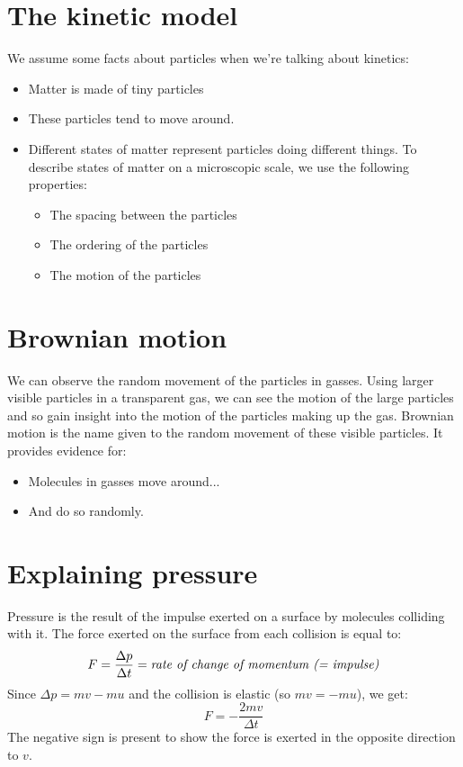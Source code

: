 \documentclass{article}
\begin{document}
\section*{The kinetic model}
\thispagestyle{empty}
We assume some facts about particles when we're talking about kinetics:
\begin{itemize}
	\item Matter is made of tiny particles
	\item These particles tend to move around.
	\item Different states of matter represent particles doing different things. To describe states of matter on a microscopic scale, we use the following properties:
		\begin{itemize}
			\item The spacing between the particles
			\item The ordering of the particles
			\item The motion of the particles
		\end{itemize}
\end{itemize}

\section*{Brownian motion}
We can observe the random movement of the particles in gasses. Using larger visible particles in a transparent gas, we can see the motion of the large particles and so gain insight into the motion of the particles making up the gas. Brownian motion is the name given to the random movement of these visible particles. It provides evidence for:
\begin{itemize}
	\item Molecules in gasses move around...
	\item And do so randomly.
\end{itemize}

\section*{Explaining pressure}
Pressure is the result of the impulse exerted on a surface by molecules colliding with it. The force exerted on the surface from each collision is equal to:
\[
	F = \frac{\Delta p}{\Delta t} = \textrm{\textit{rate of change of momentum (= impulse)}}
\]
Since $\Delta p = mv - mu$ and the collision is elastic (so $mv = -mu$), we get:
\[
	F = -\frac{2mv}{\Delta t}
\]
The negative sign is present to show the force is exerted in the opposite direction to $v$.
\end{document}
